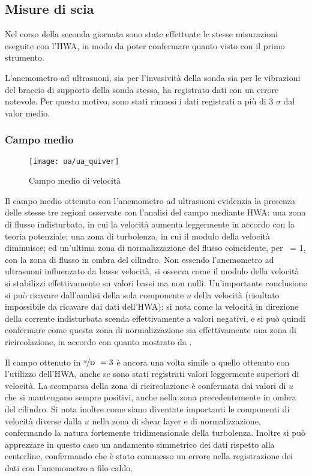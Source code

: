 \documentclass{article} %
\newcommand{\xd}{\nicefrac{\textrm{x}}{\textrm{D}}\ }
\begin{document}
\subsection{Misure di scia}
Nel corso della seconda giornata sono state effettuate le stesse misurazioni eseguite con l'HWA, in modo da poter confermare quanto visto con il primo strumento.\par
L'anemometro ad ultrasuoni, sia per l'invasività della sonda sia per le vibrazioni del braccio di supporto  della sonda stessa, ha registrato dati con un errore notevole. Per questo motivo, sono stati rimossi i dati registrati a più di 3 $\sigma$ dal valor medio.
\clearpage
\subsubsection{Campo medio}
\begin{figure}[h!]
	\centering
	\texttt{[image: ua/ua\_quiver]}
	\label{ua_campo_medio_quiver}
	\caption{Campo medio di velocità}
\end{figure}
Il campo medio ottenuto con l'anemometro ad ultrasuoni evidenzia la presenza delle stesse tre regioni osservate con l'analisi del campo mediante HWA: una zona di flusso indisturbato, in cui la velocità aumenta leggermente in accordo con la teoria potenziale; una zona di turbolenza, in cui il modulo della velocità diminuisce; ed un'ultima zona di normalizzazione del flusso coincidente, per \xd = 1, con la zona di flusso in ombra del cilindro. Non essendo l'anemometro ad ultrasuoni influenzato da basse velocità, si osserva come il modulo della velocità si stabilizzi effettivamente su valori bassi ma non nulli. Un'importante conclusione si può ricavare dall'analisi della sola componente $u$ della velocità (risultato impossibile da ricavare dai dati dell'HWA): si nota come la velocità in direzione della corrente indisturbata scenda effettivamente a valori negativi, e si può quindi confermare come questa zona di normalizzazione sia effettivamente una zona di ricircolazione, in accordo con quanto mostrato da \cite{braza06}.\par
Il campo ottenuto in $\xd = 3$ è ancora una volta simile a quello ottenuto con l'utilizzo dell'HWA, anche se sono stati registrati valori leggermente superiori di velocità. La scomparsa della zona di ricircolazione è confermata dai valori di $u$ che si mantengono sempre positivi, anche nella zona precedentemente in ombra del cilindro. Si nota inoltre come siano diventate importanti le componenti di velocità diverse dalla $u$ nella zona di shear layer e di normalizzazione, confermando la natura fortemente tridimensionale della turbolenza. Inoltre si può apprezzare in questo caso un andamento simmetrico dei dati rispetto alla centerline, confermando che è stato commesso un errore nella registrazione dei dati con l'anemometro a filo caldo.
\end{document}
